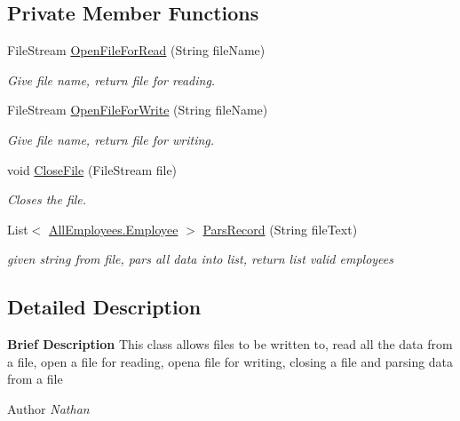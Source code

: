 \subsection*{Private Member Functions}
\begin{DoxyCompactItemize}
\item 
File\+Stream \hyperlink{class_supporting_1_1_file_i_o_ac9cebd77d6aca1292566d7e6eb4f8123}{Open\+File\+For\+Read} (String file\+Name)
\begin{DoxyCompactList}\small\item\em Give file name, return file for reading. \end{DoxyCompactList}\item 
File\+Stream \hyperlink{class_supporting_1_1_file_i_o_ab3be0f867327310b9d940d79e1147b69}{Open\+File\+For\+Write} (String file\+Name)
\begin{DoxyCompactList}\small\item\em Give file name, return file for writing. \end{DoxyCompactList}\item 
void \hyperlink{class_supporting_1_1_file_i_o_a689379fbd7441f18477d01dfde06444c}{Close\+File} (File\+Stream file)
\begin{DoxyCompactList}\small\item\em Closes the file. \end{DoxyCompactList}\item 
List$<$ \hyperlink{class_all_employees_1_1_employee}{All\+Employees.\+Employee} $>$ \hyperlink{class_supporting_1_1_file_i_o_ab4433298adf44f58cbd355eb5db0bf7f}{Pars\+Record} (String file\+Text)
\begin{DoxyCompactList}\small\item\em given string from file, pars all data into list, return list valid employees \end{DoxyCompactList}\end{DoxyCompactItemize}


\subsection{Detailed Description}
{\bfseries Brief Description} This class allows files to be written to, read all the data from a file, open a file for reading, opena file for writing, closing a file and parsing data from a file 

\begin{DoxyAuthor}{Author}
{\itshape Nathan} 
\end{DoxyAuthor}



